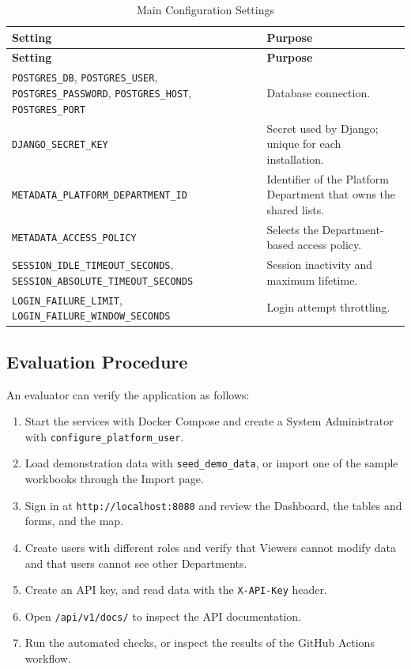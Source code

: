 \documentclass[11pt,a4paper]{article}
\begin{document}
\begin{longtable}{P{6.4cm} P{8.7cm}}
\caption{Main Configuration Settings}
\label{tab:phase3_settings}\\

\toprule
\textbf{Setting} & \textbf{Purpose} \\
\midrule
\endfirsthead

\toprule
\textbf{Setting} & \textbf{Purpose} \\
\midrule
\endhead

\bottomrule
\endfoot

\texttt{POSTGRES\_DB}, \texttt{POSTGRES\_USER}, \texttt{POSTGRES\_PASSWORD},
\texttt{POSTGRES\_HOST}, \texttt{POSTGRES\_PORT} &
Database connection. \\

\texttt{DJANGO\_SECRET\_KEY} &
Secret used by Django; unique for each installation. \\

\texttt{METADATA\_PLATFORM\_DEPARTMENT\_ID} &
Identifier of the Platform Department that owns the shared lists. \\

\texttt{METADATA\_ACCESS\_POLICY} &
Selects the Department-based access policy. \\

\texttt{SESSION\_IDLE\_TIMEOUT\_SECONDS},
\texttt{SESSION\_ABSOLUTE\_TIMEOUT\_SECONDS} &
Session inactivity and maximum lifetime. \\

\texttt{LOGIN\_FAILURE\_LIMIT},
\texttt{LOGIN\_FAILURE\_WINDOW\_SECONDS} &
Login attempt throttling. \\

\end{longtable}

\subsection{Evaluation Procedure}

An evaluator can verify the application as follows:

\begin{enumerate}
    \item Start the services with Docker Compose and create a System
    Administrator with \texttt{configure\_platform\_user}.
    \item Load demonstration data with \texttt{seed\_demo\_data}, or import
    one of the sample workbooks through the Import page.
    \item Sign in at \texttt{http://localhost:8080} and review the Dashboard,
    the tables and forms, and the map.
    \item Create users with different roles and verify that Viewers cannot
    modify data and that users cannot see other Departments.
    \item Create an API key, and read data with the \texttt{X-API-Key} header.
    \item Open \texttt{/api/v1/docs/} to inspect the API documentation.
    \item Run the automated checks, or inspect the results of the GitHub
    Actions workflow.
\end{enumerate}
\end{document}
